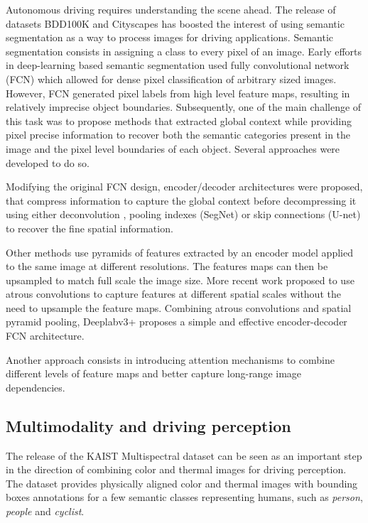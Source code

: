 \documentclass[10pt,twocolumn,letterpaper]{article}
\begin{document}
Autonomous driving requires understanding the scene ahead. The release of datasets BDD100K \cite{DBLP:conf/cvpr/YuCWXCLMD20} and Cityscapes \cite{Cordts2016Cityscapes}  has boosted the interest of using semantic segmentation as a way to process images for driving applications. Semantic segmentation consists in assigning a class to every pixel of an image. Early efforts in deep-learning based semantic segmentation used fully convolutional network (FCN) \cite{DBLP:journals/pami/ShelhamerLD17} which allowed for dense pixel classification of arbitrary sized images. However, FCN generated pixel labels from high level feature maps, resulting in relatively imprecise object boundaries. Subsequently, one of the main challenge of this task was to propose methods that extracted global context while providing pixel precise information to recover both the semantic categories present in the image and the pixel level boundaries of each object. Several approaches were developed to do so. 

Modifying the original FCN design, encoder/decoder architectures were proposed, that compress information to capture the global context before decompressing it using either deconvolution \cite{noh2015learning}, pooling indexes (SegNet)\cite{journals/corr/BadrinarayananK15} or skip connections (U-net) \cite{ronneberger2015u} to recover the fine spatial information. 

Other methods use pyramids of features \cite{farabet2012learning, zhao2017pyramid} extracted by an encoder model applied to the same image at different resolutions. The features maps can then be upsampled to match full scale the image size. 
More recent work proposed to use atrous convolutions \cite{Chen_2018_ECCV, chen2017deeplab} to capture features at different spatial scales without the need to upsample the feature maps. Combining atrous convolutions and spatial pyramid pooling, Deeplabv3+ \cite{Chen_2018_ECCV} proposes a simple and effective encoder-decoder FCN architecture. 

Another approach consists in introducing attention mechanisms \cite{fu2019dual, yu2020context, xie2021segformer} to combine different levels of feature maps and better capture long-range image dependencies. 

\subsection{Multimodality and driving perception}

The release of the KAIST Multispectral dataset \cite{hwang2015multispectral} can be seen as an important step in the direction of combining color and thermal images for driving perception.
The dataset provides physically aligned color and thermal images with bounding boxes annotations for a few semantic classes representing humans, such as \emph{person}, \emph{people} and \emph{cyclist}.
\end{document}
